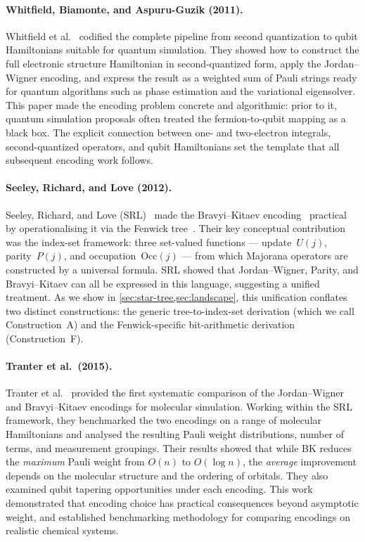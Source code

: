 \paragraph{Whitfield, Biamonte, and Aspuru-Guzik (2011).}
Whitfield et al.~\cite{whitfield2011} codified the complete pipeline
from second quantization to qubit Hamiltonians suitable for quantum
simulation.  They showed how to construct the full electronic structure
Hamiltonian in second-quantized form, apply the Jordan--Wigner encoding,
and express the result as a weighted sum of Pauli strings ready for
quantum algorithms such as phase estimation and the variational
eigensolver.  This paper made the encoding problem concrete and
algorithmic: prior to it, quantum simulation proposals often treated
the fermion-to-qubit mapping as a black box.  The explicit connection
between one- and two-electron integrals, second-quantized operators,
and qubit Hamiltonians set the template that all subsequent encoding
work follows.

\paragraph{Seeley, Richard, and Love (2012).}
Seeley, Richard, and Love (SRL)~\cite{seeley2012} made the
Bravyi--Kitaev encoding~\cite{bravyi2002} practical by
operationalising it via the Fenwick tree~\cite{fenwick1994}.  Their
key conceptual contribution was the index-set framework: three
set-valued functions --- update~$U(j)$, parity~$P(j)$, and
occupation~$\mathrm{Occ}(j)$ --- from which Majorana operators are
constructed by a universal formula.  SRL showed that Jordan--Wigner,
Parity, and Bravyi--Kitaev can all be expressed in this language,
suggesting a unified treatment.  As we show in
\cref{sec:star-tree,sec:landscape}, this unification conflates two
distinct constructions: the generic tree-to-index-set derivation
(which we call Construction~A) and the Fenwick-specific bit-arithmetic
derivation (Construction~F).

\paragraph{Tranter et al.\ (2015).}
Tranter et al.~\cite{tranter2015} provided the first systematic
comparison of the Jordan--Wigner and Bravyi--Kitaev encodings for
molecular simulation.  Working within the SRL framework, they
benchmarked the two encodings on a range of molecular Hamiltonians
and analysed the resulting Pauli weight distributions, number of
terms, and measurement groupings.  Their results showed that while BK
reduces the \emph{maximum} Pauli weight from $O(n)$ to $O(\log n)$,
the \emph{average} improvement depends on the molecular structure and
the ordering of orbitals.  They also examined qubit tapering
opportunities under each encoding.  This work demonstrated that
encoding choice has practical consequences beyond asymptotic weight,
and established benchmarking methodology for comparing encodings on
realistic chemical systems.

